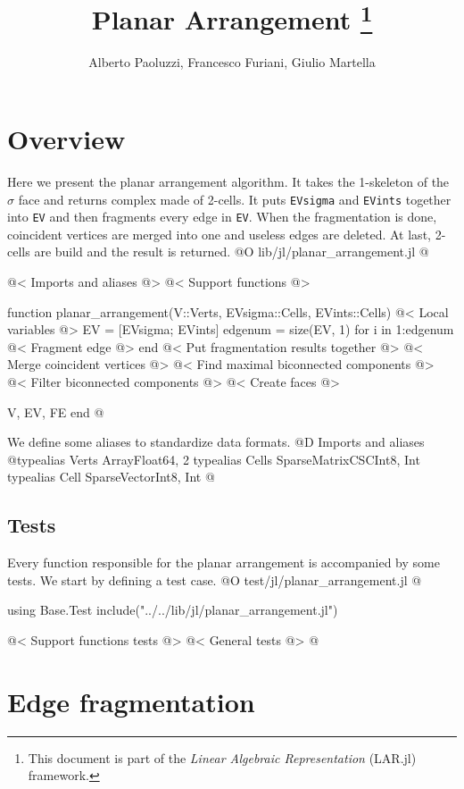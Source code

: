 \documentclass[10pt,oneside]{article}
\author{Alberto Paoluzzi, Francesco Furiani, Giulio Martella}
\title{Planar Arrangement
\footnote{This document is part of the \emph{Linear Algebraic Representation} (LAR.jl) framework.}
}
\begin{document}
\maketitle
\newpage
\tableofcontents
\newpage









\section{Overview}
Here we present the planar arrangement algorithm. It takes the 1-skeleton of the $\sigma$ face and returns complex made of 2-cells.
It puts \texttt{EVsigma} and \texttt{EVints} together into \texttt{EV} and then fragments every edge in \texttt{EV}. 
When the fragmentation is done, coincident vertices are merged into one and useless edges are deleted. At last,
2-cells are build and the result is returned.
@O lib/jl/planar_arrangement.jl
@{@< Imports and aliases @>
@< Support functions @>

function planar_arrangement(V::Verts, EVsigma::Cells, EVints::Cells)
    @< Local variables @>
    EV = [EVsigma; EVints]
    edgenum = size(EV, 1)
    for i in 1:edgenum
        @< Fragment edge @>
    end
    @< Put fragmentation results together @>
    @< Merge coincident vertices @>
    @< Find maximal biconnected components @>
    @< Filter biconnected components @>
    @< Create faces @>

    V, EV, FE
end 
@}
We define some aliases to standardize data formats.
@D Imports and aliases
@{typealias Verts Array{Float64, 2}
typealias Cells SparseMatrixCSC{Int8, Int}
typealias Cell SparseVector{Int8, Int}
@}
\subsection{Tests}
Every function responsible for the planar arrangement is accompanied by some tests.
We start by defining a test case.
@O test/jl/planar_arrangement.jl
@{using Base.Test
include("../../lib/jl/planar_arrangement.jl")

@< Support functions tests @>
@< General tests @>
@}










\section{Edge fragmentation}
\end{document}
